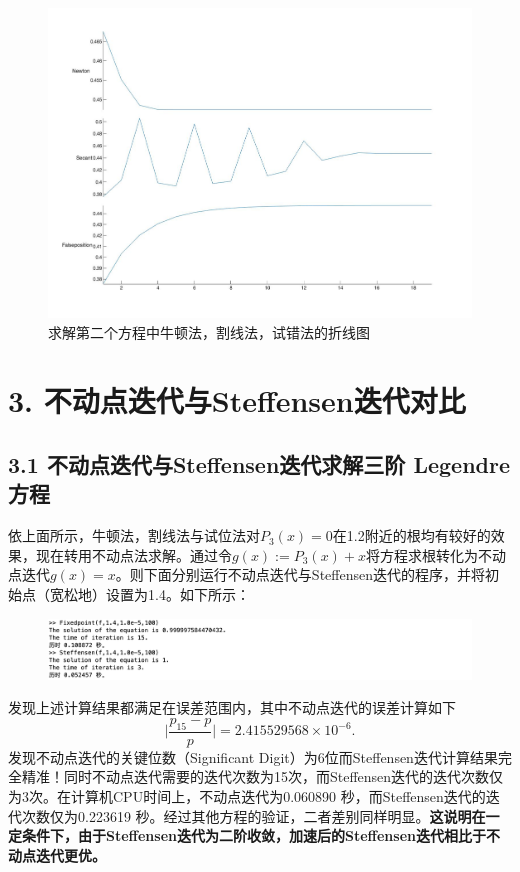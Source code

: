 \documentclass{article}
\begin{document}
    \begin{figure}[h]
    \centering
    \includegraphics[scale=0.1712]{Eq2_NSF.jpg}
    \caption{求解第二个方程中牛顿法，割线法，试错法的折线图}
    \label{求解第二个方程中牛顿法，割线法，试错法的折线图}
    \end{figure}


\newpage

\section{3. 不动点迭代与Steffensen迭代对比}

\subsection{3.1 不动点迭代与Steffensen迭代求解三阶 Legendre 方程}

    依上面所示，牛顿法，割线法与试位法对$P_3(x)=0$在1.2附近的根均有较好的效果，现在转用不动点法求解。通过令$g(x):=P_3(x)+x$将方程求根转化为不动点迭代$g(x)=x$。则下面分别运行不动点迭代与Steffensen迭代的程序，并将初始点（宽松地）设置为1.4。如下所示：
    \begin{figure}[h]
    \centering
    \includegraphics[scale=0.5]{运行程序.jpg}
    \end{figure}

    发现上述计算结果都满足在误差范围内，其中不动点迭代的误差计算如下
    $$\bigg|\frac{p_{15}-p}{p}\bigg|=2.415529568\times 10^{-6}.
    $$
    发现不动点迭代的关键位数（Significant Digit）为6位而Steffensen迭代计算结果完全精准！同时不动点迭代需要的迭代次数为15次，而Steffensen迭代的迭代次数仅为3次。在计算机CPU时间上，不动点迭代为0.060890 秒，而Steffensen迭代的迭代次数仅为0.223619 秒。经过其他方程的验证，二者差别同样明显。\textbf{这说明在一定条件下，由于Steffensen迭代为二阶收敛，加速后的Steffensen迭代相比于不动点迭代更优。}
\end{document}
